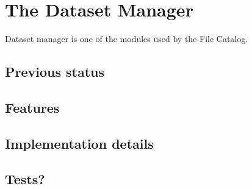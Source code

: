 \chapter{The Dataset Manager}

Dataset manager is one of the modules used by the File Catalog. 

\section{Previous status}

\section{Features}

\section{Implementation details}

\section{Tests?}

